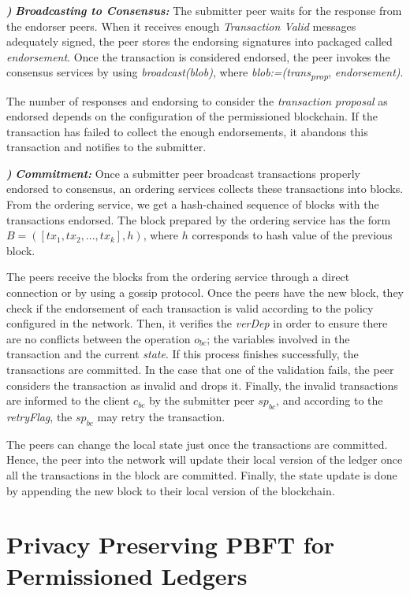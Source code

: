 \documentclass[conference]{IEEEtran}
\newcounter{paranum}
\newcommand{\Par}{\vspace{10pt}\noindent\textbf{\refstepcounter{paranum}\theparanum}\textbf\textit) }
\begin{document}
\Par{\textit{\textbf{Broadcasting to Consensus:}}} The submitter peer waits for the response from the endorser peers. When it receives enough \textit{Transaction Valid} messages adequately signed, the peer stores the endorsing signatures into packaged called \textit{endorsement}. Once the transaction is considered endorsed, the peer invokes the consensus services by using \textit{broadcast(blob)}, where \textit{blob:=(trans\textsubscript{prop}}, \textit{endorsement)}.

The number of responses and endorsing to consider the \textit{transaction proposal} as endorsed depends on the configuration of the permissioned blockchain. If the transaction has failed to collect the enough endorsements, it abandons this transaction and notifies to the submitter.

\Par{\textit{\textbf{Commitment:}}} Once a submitter peer broadcast transactions properly endorsed to consensus, an ordering services collects these transactions into blocks. From the ordering service, we get a hash-chained sequence of blocks with the transactions endorsed. The block prepared by the ordering service has the form $B=\left(\left[tx_1,tx_2,...,tx_k\right],h\right)$, where $h$ corresponds to hash value of the previous block.

The peers receive the blocks from the ordering service through a direct connection or by using a gossip protocol. Once the peers have the new block, they  check if the endorsement of each transaction is valid according to the policy configured in the network. Then, it verifies the \textit{verDep} in order to ensure there are no conflicts between the operation $o_{bc}$; the variables involved in the transaction and the current \textit{state}. If this process finishes successfully, the transactions are committed. In the case that one of the validation fails, the peer considers the transaction as invalid and drops it. Finally, the invalid transactions are informed to the client $c_{bc}$ by the submitter peer $sp_{bc}$, and according to the \textit{retryFlag}, the $sp_{bc}$ may retry the transaction.

The peers can change the local state just once the transactions are committed. Hence, the peer into the network will update their local version of the ledger once all the transactions in the block are committed. Finally, the state update is done by appending the new block to their local version of the blockchain.

\section{Privacy Preserving PBFT for Permissioned Ledgers}\label{PPPBFT}
\end{document}
